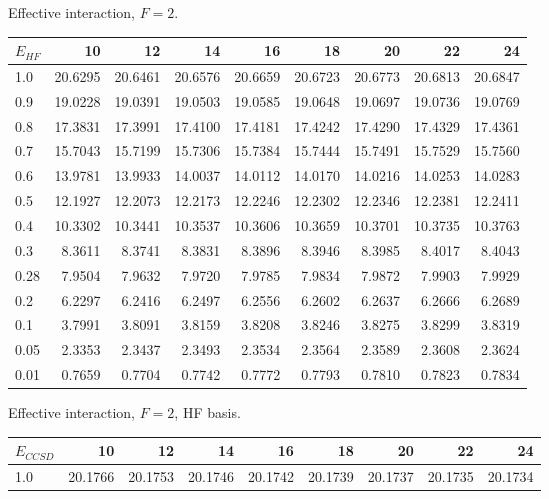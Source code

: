 \begin{landscape}
\begin{table}
\begin{center}
Effective interaction, $F=2$.\\
\begin{tabular}{l|rrrrrrrr}
\hline 
$E_{HF}$ & 10 & 12 & 14 & 16 & 18 & 20 & 22 & 24 \\
\hline \hline
1.0 & 20.6295 & 20.6461 & 20.6576 & 20.6659 & 20.6723 & 20.6773 & 20.6813  & 20.6847 \\ 
0.9 & 19.0228 & 19.0391 & 19.0503 & 19.0585 & 19.0648 & 19.0697 & 19.0736  & 19.0769 \\ 
0.8 & 17.3831 & 17.3991 & 17.4100 & 17.4181 & 17.4242 & 17.4290 & 17.4329  & 17.4361 \\ 
0.7 & 15.7043 & 15.7199 & 15.7306 & 15.7384 & 15.7444 & 15.7491 & 15.7529  & 15.7560 \\ 
0.6 & 13.9781 & 13.9933 & 14.0037 & 14.0112 & 14.0170 & 14.0216 & 14.0253  & 14.0283 \\ 
0.5 & 12.1927 & 12.2073 & 12.2173 & 12.2246 & 12.2302 & 12.2346 & 12.2381  & 12.2411 \\ 
0.4 & 10.3302 & 10.3441 & 10.3537 & 10.3606 & 10.3659 & 10.3701 & 10.3735  & 10.3763 \\ 
0.3 &  8.3611 &  8.3741 &  8.3831 &  8.3896 &  8.3946 &  8.3985 &  8.4017  &  8.4043 \\ 
0.28 & 7.9504 &  7.9632 &  7.9720 &  7.9785 &  7.9834 &  7.9872 &  7.9903  &  7.9929 \\ 
0.2 &  6.2297 &  6.2416 &  6.2497 &  6.2556 &  6.2602 &  6.2637 &  6.2666  &  6.2689 \\ 
0.1 &  3.7991 &  3.8091 &  3.8159 &  3.8208 &  3.8246 &  3.8275 &  3.8299  &  3.8319 \\ 
0.05 & 2.3353 &  2.3437 &  2.3493 &  2.3534 &  2.3564 &  2.3589 &  2.3608  &  2.3624 \\ 
0.01 & 0.7659 &  0.7704 &  0.7742 &  0.7772 &  0.7793 &  0.7810 &  0.7823  &  0.7834 \\ 
\hline \hline
\end{tabular}
\end{center}
\begin{center}
Effective interaction, $F=2$, HF basis.\\
\begin{tabular}{l|rrrrrrrr}
\hline 
$E_{CCSD}$ & 10 & 12 & 14 & 16 & 18 & 20 & 22 & 24 \\
\hline \hline
1.0 & 20.1766 & 20.1753 & 20.1746 & 20.1742 & 20.1739 & 20.1737  & 20.1735 & 20.1734 \\ 

\end{tabular}
\end{center}
\end{table}
\end{landscape}
